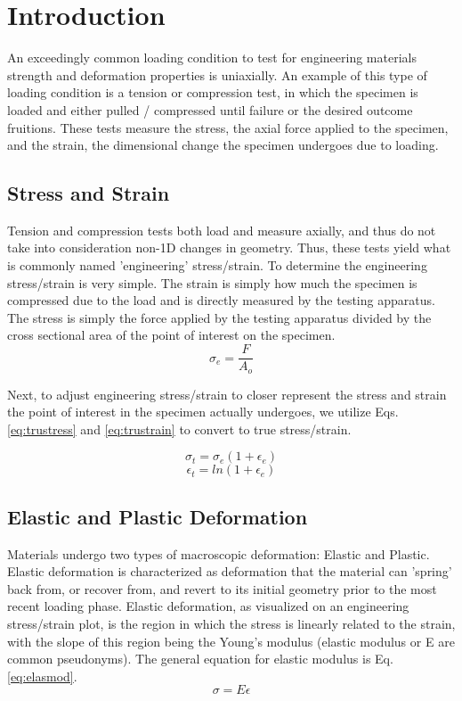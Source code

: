 \documentclass{article}
\begin{document}
\section{Introduction}
An exceedingly common loading condition to test for engineering materials strength and deformation properties is uniaxially. An example of this type of loading condition is a tension or compression test, in which the specimen is loaded and either pulled / compressed until failure or the desired outcome fruitions. These tests measure the stress, the axial force applied to the specimen, and the strain, the dimensional change the specimen undergoes due to loading.
\subsection{Stress and Strain}
Tension and compression tests both load and measure axially, and thus do not take into consideration non-1D changes in geometry. Thus, these tests yield what is commonly named 'engineering' stress/strain. To determine the engineering stress/strain is very simple. The strain is simply how much the specimen is compressed due to the load and is directly measured by the testing apparatus. The stress is simply the force applied by the testing apparatus divided by the cross sectional area of the point of interest on the specimen. 
\begin{equation}
    \sigma_e = \frac{F}{A_o}
    \label{eq:engstress}
\end{equation}

Next, to adjust engineering stress/strain to closer represent the stress and strain the point of interest in the specimen actually undergoes, we utilize Eqs. \ref{eq:trustress} and \ref{eq:trustrain} to convert to true stress/strain.

\begin{equation}
    \sigma_t = \sigma_e \left(1+ \epsilon_e \right)
    \label{eq:trustress}
\end{equation}
\begin{equation}
    \epsilon_t = ln\left(1+\epsilon_e\right)
    \label{eq:trustrain}
\end{equation}

\subsection{Elastic and Plastic Deformation}
Materials undergo two types of macroscopic deformation: Elastic and Plastic. Elastic deformation is characterized as deformation that the material can 'spring' back from, or recover from, and revert to its initial geometry prior to the most recent loading phase. Elastic deformation, as visualized on an engineering stress/strain plot, is the region in which the stress is linearly related to the strain, with the slope of this region being the Young's modulus (elastic modulus or E are common pseudonyms). The general equation for elastic modulus is Eq. \ref{eq:elasmod}. 
\begin{equation}
    \sigma = E\epsilon
    \label{eq:elasmod}
\end{equation}
\end{document}
